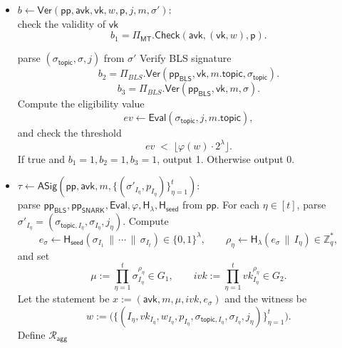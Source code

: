 \documentclass{article}
\newcommand{\ppBLS}[0]{\mathsf{pp}_{\mathsf{BLS}}}
\newcommand{\ppSNARK}[0]{\mathsf{pp}_{\mathsf{SNARK}}}
\newcommand{\pp}[0]{\mathsf{pp}}
\newcommand{\vk}[0]{\mathsf{vk}}
\newcommand{\avk}[0]{\mathsf{avk}}
\newcommand{\mkpth}[0]{\mathsf{p}}
\newcommand{\topic}[0]{\mathsf{topic}}
\begin{document}
\begin{itemize}
    \item $b \leftarrow \mathsf{Ver}(\mathsf{pp}, \avk,\vk, w, \mkpth, j, m, \sigma' )$: \\
    check the validity of $\vk$
        \[
            b_1 = \Pi_{\mathsf{MT}}.\mathsf{Check}(\avk,(\vk,w),\mkpth).
        \]
        
    parse $(\sigma_\topic, \sigma, j)$ from $\sigma'$ %
        Verify BLS signature
        \[
         b_2 = \Pi_{BLS}.\mathsf{Ver}(\ppBLS, \vk,m.\topic,\sigma_\topic).
        \]
        \[
         b_3 = \Pi_{BLS}.\mathsf{Ver}(\ppBLS, \vk,m,\sigma).
        \]
        Compute the eligibility value
        \[
          ev \leftarrow \mathsf{Eval}(\sigma_\topic, j, m.\topic),
        \]
        and check the threshold
        \[
          ev \;<\; \bigl\lfloor \varphi(w) \cdot 2^\lambda \bigr\rfloor.
        \]
        If true and $b_1 = 1,b_2 = 1,b_3 = 1$, output 1. Otherwise output 0.

  \item $\tau \leftarrow \mathsf{ASig}(\pp,\mathsf{avk}, m, \{(\sigma'_{I_\eta},p_{I_\eta})\}_{\eta=1}^{t})$:\\
        parse $\ppBLS,\ppSNARK,\mathsf{Eval},\varphi,\mathsf{H_\lambda},\mathsf{H_{seed}}$ from $\pp$. For each $\eta\in[t]$, parse $\sigma'_{I_\eta}=(\sigma_{\topic,I_\eta},\sigma_{I_\eta},j_\eta)$. Compute
        \[
          e_\sigma \leftarrow \mathsf{H_{seed}}(\sigma_{I_1}\,\|\,\cdots\,\|\,\sigma_{I_t}) \in \{0,1\}^\lambda,\qquad
          \rho_\eta \leftarrow \mathsf{H_\lambda}(e_\sigma \,\|\, I_\eta)\in\mathbb{Z}_q^\ast,
        \]
        and set
        \[
          \mu := \prod_{\eta=1}^{t} \sigma_{I_\eta}^{\rho_\eta} \in G_1,\qquad
          ivk := \prod_{\eta=1}^{t} vk_{I_\eta}^{\rho_\eta} \in G_2.
        \]
        Let the statement be $x:=(\mathsf{avk},m,\mu,ivk,e_\sigma)$ and the witness be
        \[
          w := \bigl(\{(I_\eta, vk_{I_\eta}, w_{I_\eta}, p_{I_\eta}, \sigma_{\topic,I_\eta}, \sigma_{I_\eta}, j_\eta)\}_{\eta=1}^{t}\bigr).
        \]
        Define $\mathcal{R}_{\mathsf{agg}}$ %


\end{itemize}
\end{document}
